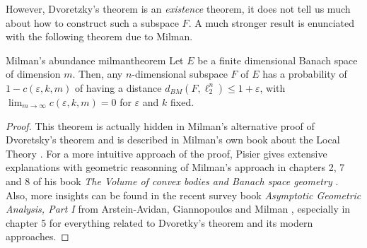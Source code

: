 However, Dvoretzky's theorem is an \emph{existence} theorem, it does not tell us much about how to construct such a subspace $F$. A much stronger result is enunciated with the following theorem due to Milman.
\begin{theorembox}{Milman's abundance \cite{milmanAsymptoticTheoryFinite2001}}{milmantheorem}
    Let $E$ be a finite dimensional Banach space of dimension $m$. Then, any $n$-dimensional subspace $F$ of $E$ has a probability of $1-c(\varepsilon, k, m)$ of having a distance $d_{BM}(F, \ell_2^n) \leq 1 + \varepsilon$, with $\lim_{m\to \infty} c(\varepsilon, k, m) = 0$ for $\varepsilon$ and $k$ fixed.
\end{theorembox}
\begin{proof}

    This theorem is actually hidden in Milman's alternative proof of Dvoretsky's theorem and is described in Milman's own book about the Local Theory \cite{milmanAsymptoticTheoryFinite2001}. For a more intuitive approach of the proof, Pisier gives extensive explanations with geometric reasonning of Milman's approach in chapters 2, 7 and 8 of his book \emph{The Volume of convex bodies and Banach space geometry} \cite{pisierVolumeConvexBodies1989}. 
    Also, more insights can be found in the recent survey book \emph{Asymptotic Geometric Analysis, Part I} from Arstein-Avidan, Giannopoulos and Milman \cite{artstein-avidanAsymptoticGeometricAnalysis2015}, especially in chapter 5 for everything related to Dvoretky's theorem and its modern approaches.
\end{proof}


